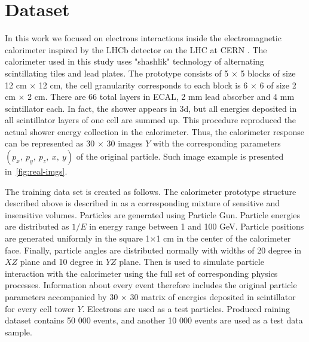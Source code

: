 \section{Dataset}
In this work we focused on electrons interactions inside the electromagnetic calorimeter inspired by the LHCb detector on the LHC at CERN \cite{LHCb} . The calorimeter used in this study uses "shashlik" technology of alternating scintillating tiles and lead plates. The prototype  consists of 5 $\times$ 5 blocks of size 12 cm $\times$ 12 cm, the cell granularity corresponds to each block is 6 $\times$ 6 of size 2 cm $\times$ 2 cm. There are 66 total layers in ECAL, 2 mm lead absorber and 4 mm scintillator each. In fact, the shower appears in 3d, but all energies deposited in all scintillator layers of one cell are summed up. This procedure reproduced the actual shower energy collection in the calorimeter. Thus, the calorimeter response can be represented as 30 $\times$ 30 images $Y$ with the corresponding parameters $(p_x,~ p_y,~ p_z,~ x,~ y)$ of the original particle. Such image example is presented in~\cref{fig:real-imgs}.

The training data set is created as follows. The calorimeter prototype structure described above is described in \geant as a corresponding mixture of sensitive and insensitive volumes. Particles are generated using Particle Gun. Particle energies are distributed as $1/E$ in energy range between 1 and 100 GeV. Particle positions are generated uniformly in the square 1$\times$1 cm in the center of the calorimeter face. Finally, particle angles are distributed normally with widths of 20 degree in $XZ$ plane and 10 degree in $YZ$ plane. Then \geant  is used to simulate particle interaction with the calorimeter using the full set of corresponding physics processes. Information about every event therefore includes the original particle parameters accompanied by 30 $\times$ 30 matrix of energies deposited in scintillator for every cell tower $Y$. Electrons are used as a test particles. Produced raining dataset contains 50 000 events, and another 10 000 events are used as a  test data sample.
